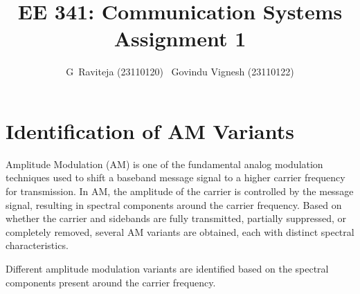 \documentclass{article}
\title{\hspace*{1.5cm}\textbf{EE 341: Communication Systems \newline Assignment 1}}
\author{G\ Raviteja (23110120) \ Govindu Vignesh (23110122)}
\date{}
\begin{document}
\maketitle

\section{Identification of AM Variants}

Amplitude Modulation (AM) is one of the fundamental analog modulation techniques used to shift a baseband message signal to a higher carrier frequency for transmission. In AM, the amplitude of the carrier is controlled by the message signal, resulting in spectral components around the carrier frequency. Based on whether the carrier and sidebands are fully transmitted, partially suppressed, or completely removed, several AM variants are obtained, each with distinct spectral characteristics.

Different amplitude modulation variants are identified based on the spectral components present around the carrier frequency.
\end{document}
